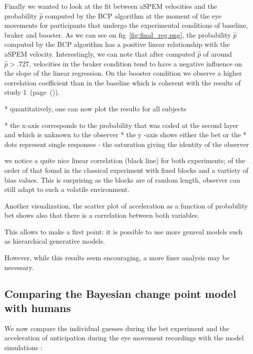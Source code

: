 \documentclass[profile,final,english, draft]{article}%
\begin{document}
 Finally we wanted to look at the fit between aSPEM velocities and the probability $\hat{p}$ computed by the BCP algorithm at the moment of the eye movements for participants that undergo the experimental conditions of baseline, braker and booster. As we can see on fig~\ref{fig:final_reg.png}, the probability $\hat{p}$ computed by the BCP algorithm has a positive linear relationship with the aSPEM velocity. Interestingly, we can note that after computed $\hat{p}$ of around $\hat{p} > .727$, velocities in the braker condition tend to have a negative influence on the slope of the linear regression. On the booster condition we observe a higher correlation coefficient than in the baseline which is coherent with the results of study 1~(page~(\pageref{chap:4})).


 * quantitatively, one can now plot the results for all subjects

 * the x-axis corresponds to the probability that was coded at the second layer and which is unknown to the observer
 * the y -axis shows either the bet or the
 * dots represent single responses - the saturation giving the identity of the observer

 we notice a quite nice linear correlation (black line) for both experiments; of the order of that found in the classical experiment with fixed blocks and a vartiety of bias values. This is surprising as the blocks are of random length, observer can still adapt to such a volatile environment.

Another visualization, the scatter plot of acceleration  as a function of probability bet shows also that there is a correlation between both  variables.

This allows to make a first point: it is possible to use more genreal models such as hierarchical generative models.

However, while this results seem encouraging, a more finer analysis may be necessary.

\subsection{Comparing the Bayesian change point model with humans}

We now compare the individual guesses during the bet experiment and the acceleration of anticipation during the eye movement recordings with the model simulations :
\end{document}
